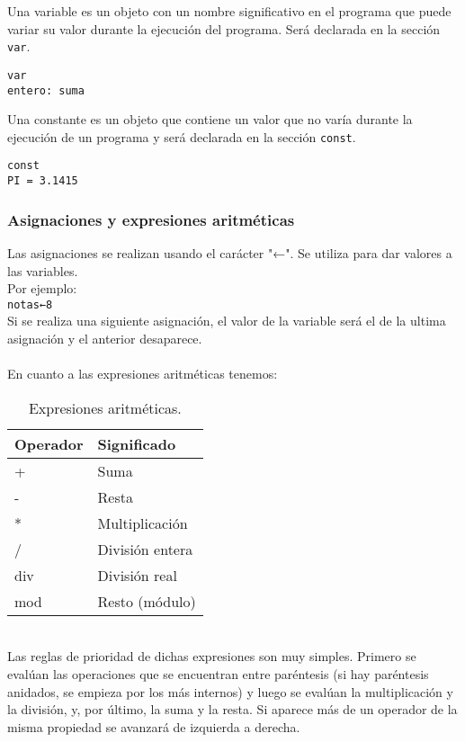 \documentclass[12pt,letterpaper]{article}
\begin{document}
Una variable es un objeto con un nombre significativo en el programa que puede variar su valor durante la ejecución del programa. Será declarada en la sección \texttt{var}.
\begin{lstlisting}
var
entero: suma
\end{lstlisting}
Una constante es un objeto que contiene un valor que no varía durante la ejecución de un programa y será declarada en la sección \texttt{const}.
\begin{lstlisting}
const
PI = 3.1415
\end{lstlisting}

\newpage

\subsubsection{Asignaciones y expresiones aritméticas}
Las asignaciones se realizan usando el carácter "←". Se utiliza para dar valores a las variables.\\
Por ejemplo:\\
\texttt{notas←8}\\
Si se realiza una siguiente asignación, el valor de la variable será el de la ultima asignación y el anterior desaparece.\\\\
En cuanto a las expresiones aritméticas tenemos:
\begin{table}[htbp]
	\begin{center}
		\begin{tabular}{|l|l|}
			\hline
			Operador & Significado \\
			\hline \hline
			+ & Suma \\ \hline
			- & Resta \\ \hline
			* & Multiplicación \\ \hline
			/ & División entera \\ \hline
			div & División real \\ \hline
			mod & Resto (módulo) \\ \hline
		\end{tabular}
		\caption{Expresiones aritméticas.}
		\label{tabla:Expresiones aritméticas}
	\end{center}
\end{table}\\
Las reglas de prioridad de dichas expresiones son muy simples. Primero se evalúan las operaciones que se encuentran entre paréntesis (si hay paréntesis anidados, se empieza por los más internos) y luego se evalúan la multiplicación y la división, y, por último, la suma y la resta. Si aparece más de un operador de la misma propiedad se avanzará de izquierda a derecha.
\end{document}
